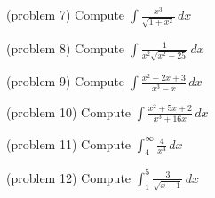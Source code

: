 \documentclass[handout]{ximera}
\begin{document}
\begin{problem}(problem 7)
Compute $\displaystyle \int \frac{x^3}{ \sqrt{1+x^2}} \, dx$

\end{problem}

\begin{problem}(problem 8)
Compute $\displaystyle \int \frac{1}{x^2 \sqrt{x^2 - 25}} \, dx$

\end{problem}

\begin{problem}(problem 9)
Compute $\displaystyle \int \frac{x^2 - 2x+3}{x^3-x} \, dx$

\end{problem}

\begin{problem}(problem 10)
Compute $\displaystyle \int \frac{x^2 + 5x + 2}{x^3 + 16x} \, dx$

\end{problem}

\begin{problem}(problem 11)
Compute $\displaystyle \int_4^\infty \frac{4}{x^4} \, dx$

\end{problem}

\begin{problem}(problem 12)
Compute $\displaystyle \int_1^5 \frac{3}{\sqrt{x-1}} \, dx$
\end{problem}
\end{document}
